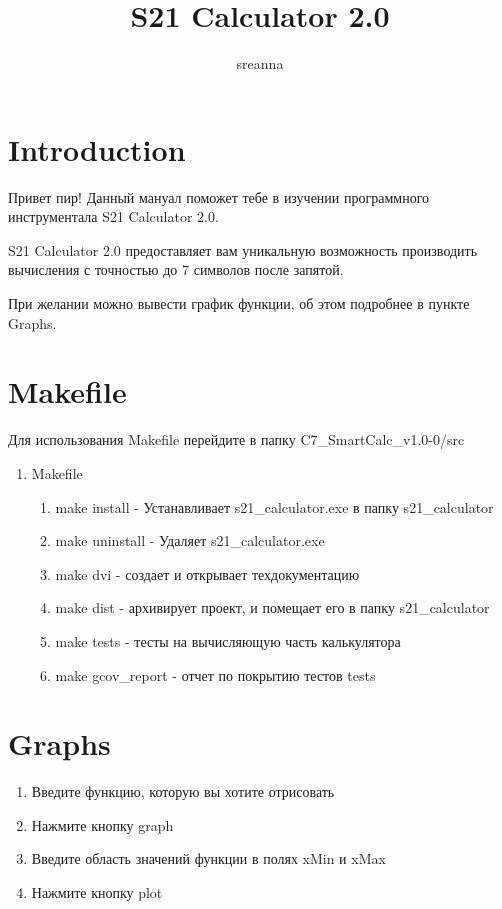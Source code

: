 \documentclass[12pt]{article}
\title{S21 Calculator 2.0}
\date{}
\author{sreanna}
\begin{document}
  \maketitle
  \section{Introduction}

  Привет пир! Данный мануал поможет тебе в изучении программного инструментала S21 Calculator 2.0.

  S21 Calculator 2.0 предоставляет вам уникальную возможность производить вычисления с точностью до 7 символов после запятой.

  При желании можно вывести график функции, об этом подробнее в пункте Graphs.

  \section{Makefile}
  Для использования Makefile перейдите в папку C7_SmartCalc_v1.0-0/src
  \begin{enumerate} 
    \item Makefile
      \begin{enumerate} 
          \item make install - Устанавливает s21_calculator.exe в папку s21_calculator
          \item make uninstall - Удаляет s21_calculator.exe
          \item make dvi - создает и открывает техдокументацию
          \item make dist - архивирует проект, и помещает его в папку s21_calculator
          \item make tests - тесты на вычисляющую часть калькулятора
          \item make gcov_report - отчет по покрытию тестов tests
      \end{enumerate}
  \end{enumerate}
  \section{Graphs}

  \begin{enumerate}
    \item Введите функцию, которую вы хотите отрисовать
    \item Нажмите кнопку graph
    \item Введите область значений функции в полях xMin и xMax
    \item Нажмите кнопку plot
  \end{enumerate}
  
  \newline
\end{document}
